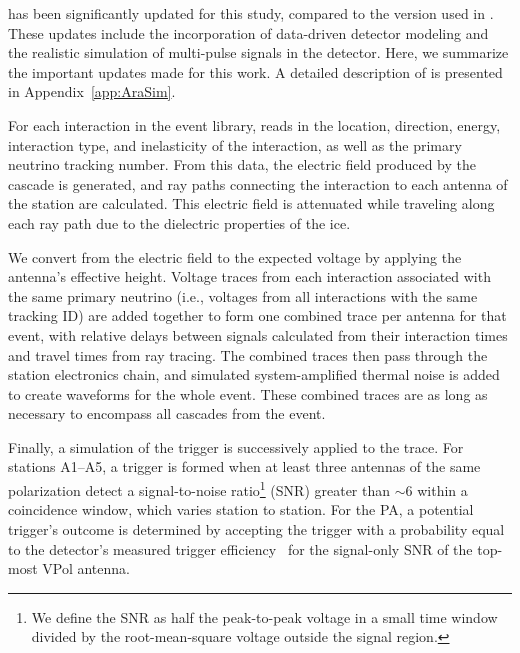       \arasim{} has been significantly updated for this study, compared to the version used in \citep{ara_a23, ara_pa_analysis}.
      These updates include the incorporation of data-driven detector modeling and the realistic simulation of multi-pulse signals in the detector.
      Here, we summarize the important updates made for this work.
      A detailed description of \arasim{} is presented in Appendix~\ref{app:AraSim}.

      For each interaction in the event library, \arasim{} reads in the location, direction, energy, interaction type, and inelasticity of the interaction, as well as the primary neutrino tracking number.
      From this data, the electric field produced by the cascade is generated, and ray paths connecting the interaction to each antenna of the station are calculated.
      This electric field is attenuated while traveling along each ray path due to the dielectric properties of the ice.
      
      We convert from the electric field to the expected voltage by applying the antenna's effective height.
      Voltage traces from each interaction associated with the same primary neutrino (i.e., voltages from all interactions with the same tracking ID) are added together to form one combined trace per antenna for that event, with relative delays between signals calculated from their interaction times and travel times from ray tracing.
      The combined traces then pass through the station electronics chain, and simulated system-amplified thermal noise is added to create waveforms for the whole event.
      These combined traces are as long as necessary to encompass all cascades from the event.
      
      Finally, a simulation of the trigger is successively applied to the trace.
      For stations A1--A5, a trigger is formed when at least three antennas of the same polarization detect a signal-to-noise ratio\footnote{We define the SNR as half the peak-to-peak voltage in a small time window divided by the root-mean-square voltage outside the signal region.} (SNR) greater than $\sim6$ within a coincidence window, which varies station to station.
      For the PA, a potential trigger's outcome is determined by accepting the trigger with a probability equal to the detector's measured trigger efficiency~\citep{ara_pa_design} for the signal-only SNR of the top-most VPol antenna.
      
